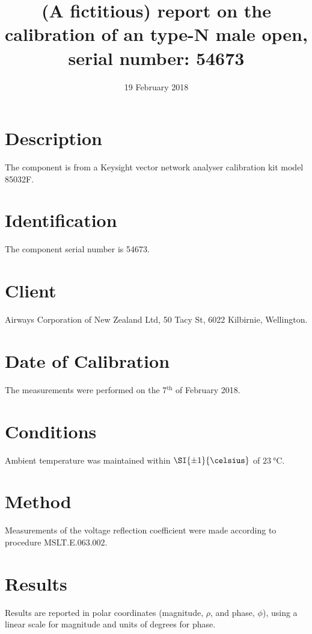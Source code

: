 \documentclass[IANZ]{MSLCalCert}
\begin{document}

 \date{19 February 2018}   %
 
 
 \title{
 	(A fictitious) report on the calibration of an type-N male open, 
 	serial number: 54673
 }
 \maketitlepage

	
%
\section{Description}
The component is from a Keysight vector network analyser calibration kit model 85032F. 


\section{Identification}
The component serial number is 54673.

\section{Client}
Airways Corporation of New Zealand Ltd, 50 Tacy St, 6022 Kilbirnie, Wellington.

\section{Date of Calibration}
The measurements were performed on the 7$^\mathrm{th}$ of February 2018.

\section{Conditions}
Ambient temperature was maintained within $\SI{\pm 1}{\celsius}$ of $\SI{23}{\celsius}$.

\section{Method}
Measurements of the voltage reflection coefficient were made according to procedure MSLT.E.063.002. 

\section{Results}
Results are reported in polar coordinates (magnitude, $\rho$, and phase, $\phi$), using a linear scale for magnitude and units of degrees for phase. 
\end{document}
